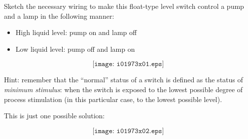 

Sketch the necessary wiring to make this float-type level switch control a pump and a lamp in the following manner:

\begin{itemize}
\item{} High liquid level: pump on and lamp off
\item{} Low liquid level: pump off and lamp on
\end{itemize}

$$\texttt{[image: i01973x01.eps]}$$

Hint: remember that the ``normal'' status of a switch is defined as the status of {\it minimum stimulus}: when the switch is exposed to the lowest possible degree of process stimulation (in this particular case, to the lowest possible level).








This is just one possible solution:

$$\texttt{[image: i01973x02.eps]}$$











